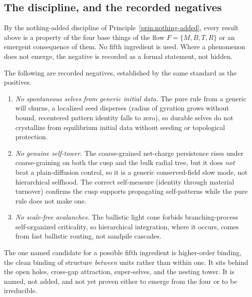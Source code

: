 \subsection{The discipline, and the recorded negatives}

By the nothing-added discipline of Principle~\ref{prin:nothing-added}, every result above is a property of the
four base things of the flow $F = \{M, B, T, R\}$ or an emergent consequence of them. No fifth ingredient is used.
Where a phenomenon does not emerge, the negative is recorded as a formal statement, not hidden.

\begin{result}
The following are recorded negatives, established by the same standard as the positives.
\begin{enumerate}
\item \emph{No spontaneous selves from generic initial data.} The pure rule from a generic will churns, a
localized seed disperses (radius of gyration grows without bound, recentered pattern identity falls to zero), so
durable selves do not crystallize from equilibrium initial data without seeding or topological protection.
\item \emph{No genuine self-tower.} The coarse-grained net-charge persistence rises under coarse-graining on both
the cusp and the bulk radial tree, but it does \emph{not} beat a plain-diffusion control, so it is a generic
conserved-field slow mode, not hierarchical selfhood. The correct self-measure (identity through material
turnover) confirms the cusp supports propagating self-patterns while the pure rule does not make one.
\item \emph{No scale-free avalanches.} The ballistic light cone forbids branching-process self-organized
criticality, so hierarchical integration, where it occurs, comes from fast ballistic routing, not sandpile
cascades.
\end{enumerate}
\end{result}

The one named candidate for a possible fifth ingredient is higher-order binding, the clean binding of structure
\emph{between} units rather than within one. It sits behind the open holes, cross-gap attraction, super-selves,
and the nesting tower. It is named, not added, and not yet proven either to emerge from the four or to be
irreducible.
